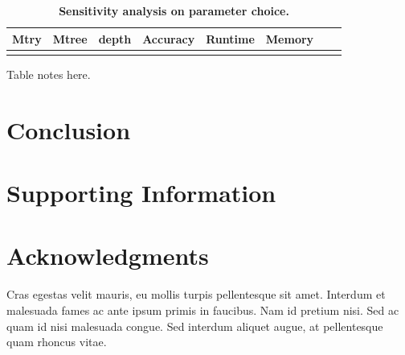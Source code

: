 \documentclass[10pt,a4paper]{article}  %
\begin{document}
\begin{table}[!ht]
\caption{
{\bf Sensitivity analysis on parameter choice.}}
\begin{tabular}{|l|l|l|l|l|l|l|l|}
\hline
\bf{Mtry}  & \bf{Mtree} & \bf{depth} & \bf{Accuracy} & \bf{Runtime} & \bf{Memory} \\
\hline
&&&&&\\ \hline
\end{tabular}
\begin{flushleft} 
  Table notes here.
\end{flushleft}
\label{table2}
\end{table}




\section{Conclusion}




\section{Supporting Information}



\section*{Acknowledgments}
Cras egestas velit mauris, eu mollis turpis pellentesque sit amet. Interdum et malesuada fames ac ante ipsum primis in faucibus. Nam id pretium nisi. Sed ac quam id nisi malesuada congue. Sed interdum aliquet augue, at pellentesque quam rhoncus vitae.

\nolinenumbers


\end{document}
